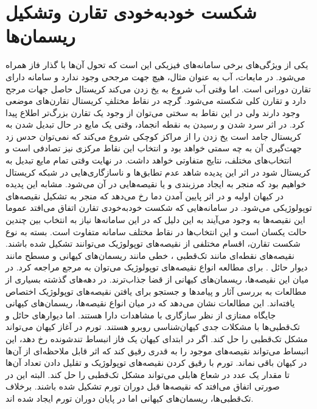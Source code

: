 \section{شکست خودبه‌خودی تقارن وتشکیل ریسمان‌ها}
\label{sec:ssb}
یکی از ویژگی‌های برخی سامانه‌های فیزیکی این است که تحول آن‌ها با گذار فاز همراه می‌شود. در مایعات، آب به عنوان مثال، هیچ جهت مرجحی وجود ندارد و سامانه دارای تقارن دورانی است. اما وقتی آب شروع به یخ زدن می‌کند کریستال حاصل جهات مرجح دارد و تقارن کلی شکسته می‌شود. گرچه در نقاط مختلفِ کریستال تقارن‌های موضعی وجود دارند ولی در این نقاط به سختی می‌توان از وجود یک تقارن بزرگ‌تر اطلاع پیدا کرد.
\cite{davis2005fundamental}
در اثر سرد شدن و رسیدن به نقطه انجماد، وقتی یک مایع در حال تبدیل شدن به کریستال جامد است یخ زدن را از مراکز کوچکی شروع می‌کند که نمی‌توان حدس زد جهت‌گیری آن به چه سمتی خواهد بود و انتخاب این نقاط مرکزی نیز تصادفی است و انتخاب‌های مختلف، نتایج متفاوتی خواهد داشت. در نهایت وقتی تمام مایع تبدیل به کریستال شود در اثر این پدیده شاهد عدم تطابق‌ها و ناسازگاری‌هایی در شبکه کریستال خواهیم بود که منجر به ایجاد مرزبندی و یا نقیصه‌هایی در آن می‌شود. مشابه این پدیده در کیهان اولیه و در اثر پایین آمدن دما رخ می‌دهد که منجر به تشکیل نقیصه‌های توپولوژیکی
می‌شود. در سامانه‌هایی که شکست خودبه‌خودی تقارن اتفاق می‌افتد عموما این نقیصه‌ها به وجود می‌آیند به این دلیل که در این سامانه‌ها نیاز به انتخاب بین چندین حالت یکسان است و این انتخاب‌ها در نقاط مختلف سامانه متفاوت است.
\cite{rajantie2003defect}
بسته به نوع شکست تقارن، اقسام مختلفی از نقیصه‌های توپولوژیک می‌توانند تشکیل شده باشند. نقیصه‌های نقطه‌ای مانند تک‌قطبی
، خطی مانند ریسمان‌های کیهانی و مسطح مانند دیوار حائل
. برای مطالعه انواع نقیصه‌های توپولوژیک می‌توان به مرجع
\cite{vilenkin2000cosmic}    
مراجعه کرد.
در میان این نقیصه‌ها، ریسمان‌های کیهانی از قضا جذاب‌ترند. در دهه‌های گذشته بسیاری از مطالعات به بررسی آثار و پیامدها و جستجو برای یافتن نقیصه‌های توپولوژیک اختصاص یافته‌اند. این مطالعات نشان می‌دهد که در میان انواع نقیصه‌ها، ریسمان‌های کیهانی جایگاه ممتازی از نظر سازگاری با مشاهدات دارا هستند. اما دیوارهای حائل و تک‌قطبی‌ها با مشکلات جدی کیهان‌شناسی روبرو هستند. تورم در آغاز کیهان می‌تواند مشکل تک‌قطبی را حل کند. اگر در ابتدای کیهان یک فاز انبساط تندشونده رخ دهد، این انبساط می‌تواند نقیصه‌های موجود را به قدری رقیق کند که اثر قابل ملاحظه‌ای از آن‌ها در کیهان باقی نماند.
\cite{guth1981inflationary}  
تورم با رقیق کردن نقیصه‌های توپولوژیک و تقلیل دادن تعداد آن‌ها تا مقدار یک عدد در شعاع هابلی می‌تواند مشکل تک‌قطبی را حل کند. البته این در صورتی اتفاق می‌افتد که نقیصه‌ها قبل دوران تورم تشکیل شده باشند.         
\cite{avelino2007effects}
برخلاف تک‌قطبی‌ها، ریسمان‌های کیهانی اما در پایان دوران تورم ایجاد شده‌ اند.
\cite{jeannerot2003generic}

